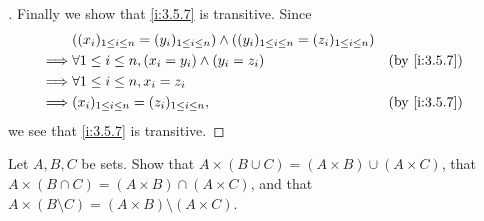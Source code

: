 \begin{proof}[]
  Finally we show that \cref{i:3.5.7} is transitive.
  Since
  \begin{align*}
             & \pa{(x_i)_{1 \leq i \leq n} = (y_i)_{1 \leq i \leq n}} \land \pa{(y_i)_{1 \leq i \leq n} = (z_i)_{1 \leq i \leq n}}                   \\
    \implies & \forall 1 \leq i \leq n, (x_i = y_i) \land (y_i = z_i)                                                              &  & \by{i:3.5.7} \\
    \implies & \forall 1 \leq i \leq n, x_i = z_i                                                                                                    \\
    \implies & (x_i)_{1 \leq i \leq n} = (z_i)_{1 \leq i \leq n},                                                                  &  & \by{i:3.5.7}
  \end{align*}
  we see that \cref{i:3.5.7} is transitive.
\end{proof}

\begin{ex}\label{i:ex:3.5.4}
  Let \(A, B, C\) be sets.
  Show that \(A \times (B \cup C) = (A \times B) \cup (A \times C)\), that \(A \times (B \cap C) = (A \times B) \cap (A \times C)\), and that \(A \times (B \setminus C) = (A \times B) \setminus (A \times C)\).
\end{ex}

